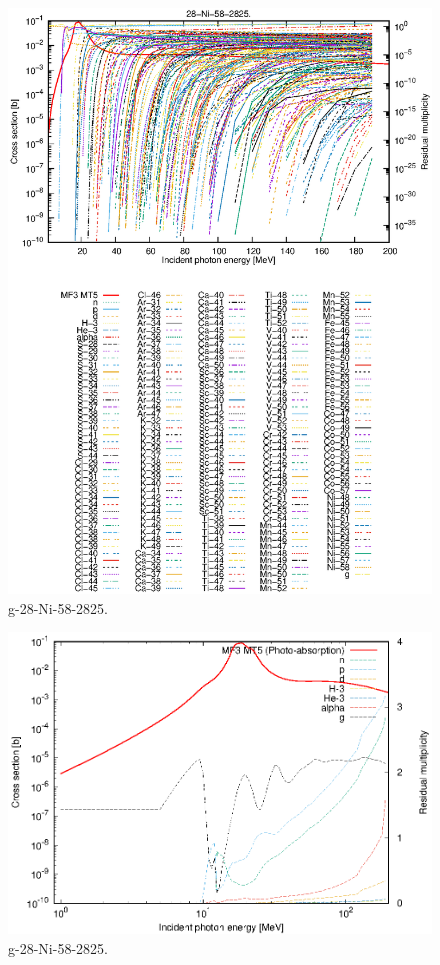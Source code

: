 \begin{figure}
 \includegraphics[width=\linewidth]{eps/g_28-Ni-58_2825.eps}
  \caption{g-28-Ni-58-2825.}
\end{figure}
\newpage \clearpage

\begin{figure}
 \includegraphics[width=\linewidth]{eps-log/g_28-Ni-58_2825.eps}
 \caption{g-28-Ni-58-2825.}
\end{figure}
\newpage \clearpage

